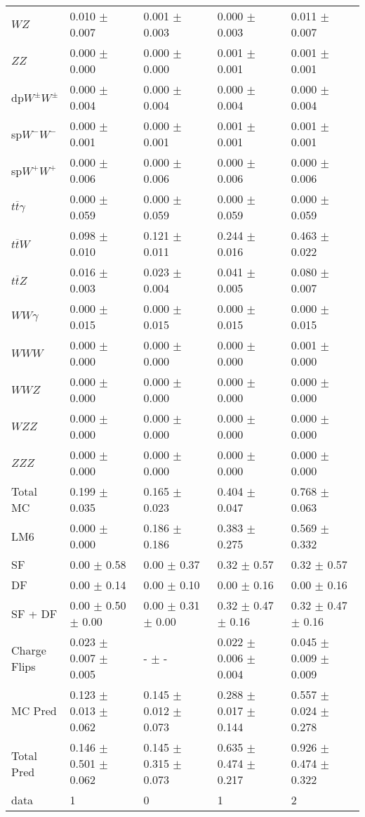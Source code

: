 \begin{tabular}{l | l l l l}
$WZ$ &  0.010 $\pm$  0.007 &  0.001 $\pm$  0.003 &   0.000 $\pm$  0.003 &  0.011 $\pm$  0.007\\
$ZZ$ &  0.000 $\pm$   0.000 &  0.000 $\pm$   0.000 &  0.001 $\pm$  0.001 &  0.001 $\pm$  0.001\\
\hline
dp$W^{\pm}W^{\pm}$ &  0.000 $\pm$  0.004 &  0.000 $\pm$  0.004 &  0.000 $\pm$  0.004 &  0.000 $\pm$  0.004\\
sp$W^{-}W^{-}$ &  0.000 $\pm$  0.001 &  0.000 $\pm$  0.001 &  0.001 $\pm$  0.001 &  0.001 $\pm$  0.001\\
sp$W^{+}W^{+}$ &  0.000 $\pm$  0.006 &  0.000 $\pm$  0.006 &  0.000 $\pm$  0.006 &  0.000 $\pm$  0.006\\
$t\overline{t}\gamma$ &  0.000 $\pm$  0.059 &  0.000 $\pm$  0.059 &  0.000 $\pm$  0.059 &  0.000 $\pm$  0.059\\
$t\overline{t}W$ &  0.098 $\pm$  0.010 &  0.121 $\pm$  0.011 &  0.244 $\pm$  0.016 &  0.463 $\pm$  0.022\\
$t\overline{t}Z$ &  0.016 $\pm$  0.003 &  0.023 $\pm$  0.004 &  0.041 $\pm$  0.005 &  0.080 $\pm$  0.007\\
$WW\gamma$ &  0.000 $\pm$  0.015 &  0.000 $\pm$  0.015 &  0.000 $\pm$  0.015 &  0.000 $\pm$  0.015\\
$WWW$ &   0.000 $\pm$   0.000 &   0.000 $\pm$   0.000 &   0.000 $\pm$   0.000 &  0.001 $\pm$   0.000\\
$WWZ$ &  0.000 $\pm$   0.000 &  0.000 $\pm$   0.000 &  0.000 $\pm$   0.000 &  0.000 $\pm$   0.000\\
$WZZ$ &   0.000 $\pm$   0.000 &  0.000 $\pm$   0.000 &   0.000 $\pm$   0.000 &   0.000 $\pm$   0.000\\
$ZZZ$ &  0.000 $\pm$   0.000 &  0.000 $\pm$   0.000 &   0.000 $\pm$   0.000 &   0.000 $\pm$   0.000\\
\hline
Total MC &  0.199 $\pm$  0.035 &  0.165 $\pm$  0.023 &  0.404 $\pm$  0.047 &  0.768 $\pm$  0.063\\
\hline\hline
\hline
LM6 &  0.000 $\pm$  0.000 &  0.186 $\pm$  0.186 &  0.383 $\pm$  0.275 &  0.569 $\pm$  0.332\\
\hline\hline
\hline\hline
 SF  & 0.00 $\pm$ 0.58 & 0.00 $\pm$ 0.37 & 0.32 $\pm$ 0.57 & 0.32 $\pm$ 0.57\\
 DF  & 0.00 $\pm$ 0.14 & 0.00 $\pm$ 0.10 & 0.00 $\pm$ 0.16 & 0.00 $\pm$ 0.16\\
\hline
 SF + DF  & 0.00 $\pm$ 0.50 $\pm$ 0.00 & 0.00 $\pm$ 0.31 $\pm$ 0.00 & 0.32 $\pm$ 0.47 $\pm$ 0.16 & 0.32 $\pm$ 0.47 $\pm$ 0.16\\
\hline\hline
Charge Flips & 0.023 $\pm$ 0.007 $\pm$ 0.005 & - $\pm$ - & 0.022 $\pm$ 0.006 $\pm$ 0.004 & 0.045 $\pm$ 0.009 $\pm$ 0.009\\
\hline\hline
\hline
MC Pred &  0.123 $\pm$  0.013 $\pm$  0.062 &  0.145 $\pm$  0.012 $\pm$  0.073 &  0.288 $\pm$  0.017 $\pm$  0.144 &  0.557 $\pm$  0.024 $\pm$  0.278\\
\hline\hline
Total Pred &  0.146 $\pm$  0.501 $\pm$  0.062 &  0.145 $\pm$  0.315 $\pm$  0.073 &  0.635 $\pm$  0.474 $\pm$  0.217 &  0.926 $\pm$  0.474 $\pm$  0.322\\
\hline\hline
data & 1 & 0 & 1 & 2\\
\hline\hline
\end{tabular}
